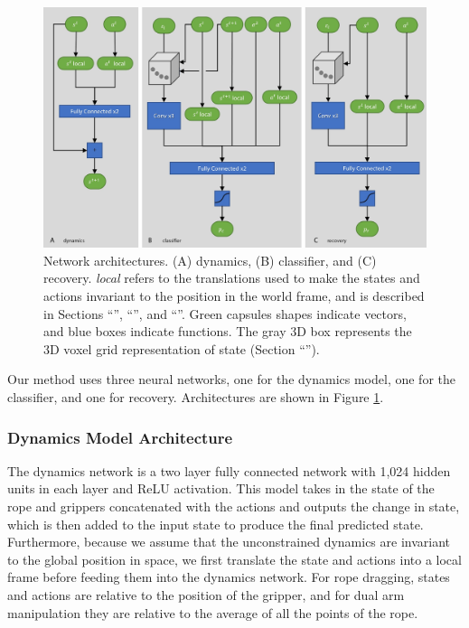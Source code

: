 \begin{figure}
    \centering
    \includegraphics[width=0.7\linewidth]{Chap2/images/figure4}
    \caption{Network architectures. (A) dynamics, (B) classifier, and (C) recovery. \textit{local} refers to the translations used to make the states and actions invariant to the position in the world frame, and is described in Sections ``'', ``'', and ``''. Green capsules shapes indicate vectors, and blue boxes indicate functions. The gray 3D box represents the 3D voxel grid representation of state (Section ``'').}
    \label{Scirob:fig:figure4}
\end{figure}

Our method uses three neural networks, one for the dynamics model, one for the classifier, and one for recovery. Architectures are shown in Figure \ref{Scirob:fig:figure4}.

\subsubsection{Dynamics Model Architecture}

The dynamics network is a two layer fully connected network with 1,024 hidden units in each layer and ReLU activation. This model takes in the state of the rope and grippers concatenated with the actions and outputs the change in state, which is then added to the input state to produce the final predicted state. Furthermore, because we assume that the unconstrained dynamics are invariant to the global position in space, we first translate the state and actions into a local frame before feeding them into the dynamics network. For rope dragging, states and actions are relative to the position of the gripper, and for dual arm manipulation they are relative to the average of all the points of the rope. 

